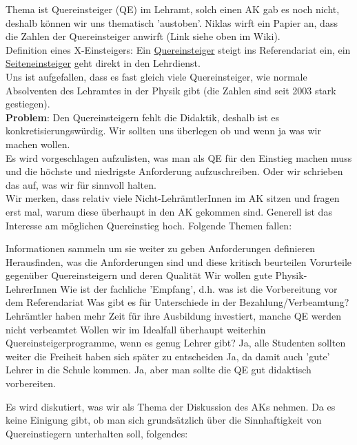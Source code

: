       Thema ist Quereinsteiger (QE) im Lehramt, solch einen AK gab es noch nicht, deshalb können wir uns thematisch 'austoben'. Niklas wirft ein Papier an, dass die Zahlen der Quereinsteiger anwirft (Link siehe oben im Wiki). \\
      Definition eines X-Einsteigers: Ein \underline{Quereinsteiger} steigt ins Referendariat ein, ein \underline{Seiteneinsteiger} geht direkt in den Lehrdienst. \\
      Uns ist aufgefallen, dass es fast gleich viele Quereinsteiger, wie normale Absolventen des Lehramtes in der Physik gibt (die Zahlen sind seit 2003 stark gestiegen). \\
      \textbf{Problem}: Den Quereinsteigern fehlt die Didaktik, deshalb ist es konkretisierungswürdig. Wir sollten uns überlegen ob und wenn ja was wir machen wollen. \\
      Es wird vorgeschlagen aufzulisten, was man als QE für den Einstieg machen muss und die höchste und niedrigste Anforderung aufzuschreiben. Oder wir schrieben das auf, was wir für sinnvoll halten. \\
      Wir merken, dass relativ viele Nicht-LehrämtlerInnen im AK sitzen und fragen erst mal, warum diese überhaupt in den AK gekommen sind. Generell ist das Interesse am möglichen Quereinstieg hoch. Folgende Themen fallen:
      \begin{outline}
        \1 Informationen sammeln um sie weiter zu geben
        \1 Anforderungen definieren
        \1 Herausfinden, was die Anforderungen sind und diese kritisch beurteilen
        \1 Vorurteile gegenüber Quereinsteigern und deren Qualität
        \1 Wir wollen gute Physik-LehrerInnen
        \1 Wie ist der fachliche 'Empfang', d.h. was ist die Vorbereitung vor dem Referendariat
        \1 Was gibt es für Unterschiede in der Bezahlung/Verbeamtung? Lehrämtler haben mehr Zeit für ihre Ausbildung investiert, manche QE werden nicht verbeamtet
        \1 Wollen wir im Idealfall überhaupt weiterhin Quereinsteigerprogramme, wenn es genug Lehrer gibt?
          \2 Ja, alle Studenten sollten weiter die Freiheit haben sich später zu entscheiden
          \2 Ja, da damit auch 'gute' Lehrer in die Schule kommen.
          \2 Ja, aber man sollte die QE gut didaktisch vorbereiten.
      \end{outline}
      Es wird diskutiert, was wir als Thema der Diskussion des AKs nehmen. Da es keine Einigung gibt, ob man sich grundsätzlich über die Sinnhaftigkeit von Quereinstiegern unterhalten soll, folgendes:

